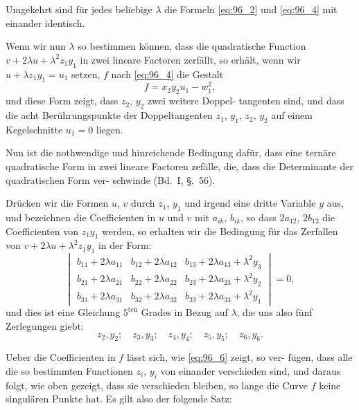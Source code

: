 \documentclass[12pt,a4paper]{article}
\theoremstyle{plain}
\theoremstyle{definition}
\theoremstyle{remark}
\begin{document}
Umgekehrt sind für jedes beliebige $\lambda$ die Formeln \eqref{eq:96_2} und \eqref{eq:96_4}
mit einander identisch.

Wenn wir nun $\lambda$ so bestimmen können, dass die quadratische
Function $v + 2\lambda u + \lambda^2 z_1 y_1$ in zwei lineare Factoren zerfällt,
so erhält, wenn wir $u + \lambda z_1 y_1 = u_1$ setzen, $f$ nach \eqref{eq:96_4} die
Gestalt
\begin{equation}\label{eq:96_5}
f = x_2 y_2 u_1 - w_1^2,
\end{equation}
und diese Form zeigt, dass $z_2$, $y_2$ zwei weitere Doppel-
tangenten sind, und dass die acht Berührungspunkte der
Doppeltangenten $z_1$, $y_1$, $z_2$, $y_2$ auf einem Kegelschnitte $u_1 = 0$
liegen.

Nun ist die nothwendige und hinreichende Bedingung dafür,
dass eine ternäre quadratische Form in zwei lineare Factoren
zefälle, die, dass die Determinante der quadratischen Form ver-
schwinde (Bd.~I, \S.~56).

Drücken wir die Formen $u$, $v$ durch $z_1$, $y_1$ und irgend eine
dritte Variable $y$ aus, und bezeichnen die Coefficienten in $u$ und
$v$ mit $a_{ik}$, $b_{ik}$, so dass $2a_{12}$, $2b_{12}$ die Coefficienten von $z_1 y_1$
werden, so erhalten wir die Bedingung für das Zerfallen von
$v + 2\lambda u + \lambda^2 z_1 y_1$ in der Form:
\begin{equation}\label{eq:96_6}
\begin{vmatrix}
b_{11} + 2\lambda a_{11} & b_{12} + 2\lambda a_{12} & b_{13} + 2\lambda a_{13} + \lambda^2 y_3 \\
b_{21} + 2\lambda a_{21} & b_{22} + 2\lambda a_{22} & b_{23} + 2\lambda a_{23} + \lambda^2 y_2 \\
b_{31} + 2\lambda a_{31} & b_{32} + 2\lambda a_{32} & b_{33} + 2\lambda a_{33} + \lambda^2 y_1
\end{vmatrix} = 0,
\end{equation}
und dies ist eine Gleichung $5^{\text{ten}}$ Grades in Bezug auf $\lambda$, die uns
also fünf Zerlegungen giebt:
\begin{equation*}
z_2, y_2; \quad z_3, y_3; \quad z_4, y_4; \quad z_5, y_5; \quad z_6, y_6.
\end{equation*}

Ueber die Coefficienten in $f$ lässt sich, wie \eqref{eq:96_6} zeigt, so ver-
fügen, dass alle die so bestimmten Functionen $z_i$, $y_i$ von einander
verschieden sind, und daraus folgt, wie oben gezeigt, dass sie
verschieden bleiben, so lange die Curve $f$ keine singulären Punkte
hat. Es gilt also der folgende Satz:
\end{document}
